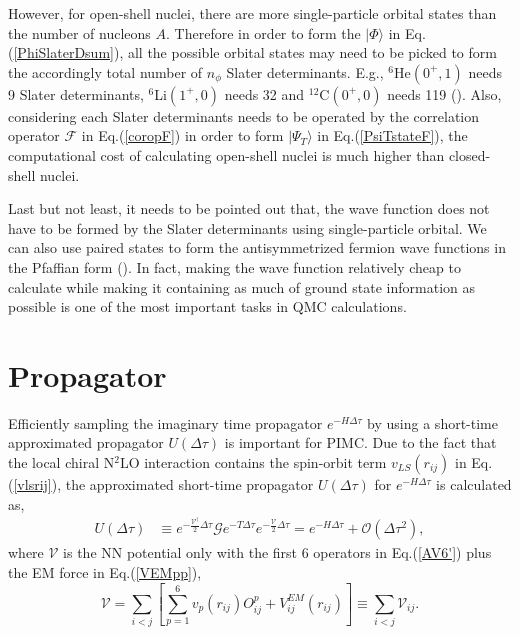 \documentclass[12pt,letterpaper,UTF8]{report}
\begin{document}
However, for open-shell nuclei, there are more single-particle orbital states than the number of nucleons $A$. Therefore in order to form the $|\Phi \rangle$ in Eq.(\ref{PhiSlaterDsum}),  all the possible orbital states may need to be picked to form the accordingly total number of $n_\phi$ Slater determinants. E.g., $^6$He$(0^+,1)$ needs 9 Slater determinants, $^6$Li$(1^+,0)$ needs 32 and $^12$C$(0^+,0)$ needs 119 (\cite{Lonardoni2018PRC}).
Also, considering each Slater determinants needs to be operated by the correlation operator $\mathcal{F}$ in Eq.(\ref{coropF}) in order to form $|\Psi_T \rangle$ in Eq.(\ref{PsiTstateF}), the computational cost of calculating open-shell nuclei is much higher than closed-shell nuclei.

Last but not least, it needs to be pointed out that, the wave function does not have to be formed by the Slater determinants using single-particle orbital. We can also use paired states to form the antisymmetrized fermion wave functions in the Pfaffian  form (\cite{Bouchaud1988a,Bajdich2006PRL}). In fact, making the wave function relatively cheap to calculate while making it containing as much of ground state information as possible is one of the most important tasks in QMC calculations.





\section{Propagator}
\label{propagator}
Efficiently sampling the imaginary time propagator $e^{-H \Delta \tau}$ by using a short-time approximated propagator $U(\Delta \tau)$ is important for PIMC.
Due to the fact that the local chiral N$^2$LO interaction contains the spin-orbit term $v_{LS}(r_{ij})$ in Eq.(\ref{vlsrij}), the approximated  short-time propagator $U(\Delta \tau)$ for $e^{-H \Delta \tau}$ is calculated as,
\begin{align}
U(\Delta \tau) & \equiv
e^{-\frac{\mathcal{V}^\dagger}{2} \Delta \tau }
\mathcal{G}
e^{-T \Delta \tau} e^{-\frac{\mathcal{V}}{2} \Delta \tau }
= e^{-H \Delta \tau} + \mathcal{O}(\Delta \tau^2),
\label{propagatorN2LOVTV}
\end{align}
where $\mathcal{V}$ is the NN potential only with the first 6 operators in Eq.(\ref{AV6'}) plus the EM force in Eq.(\ref{VEMpp}),
\begin{equation}
\mathcal{V}  =  \sum_{i<j} \left[\sum_{p=1}^6 v_p(r_{ij}) O_{ij}^p + V^{EM}_{ij}(r_{ij}) \right]
\equiv \sum_{i<j} \mathcal{V}_{ij} .
\label{PER}
\end{equation}
\end{document}
